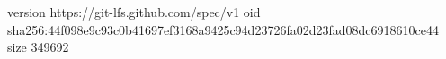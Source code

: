 version https://git-lfs.github.com/spec/v1
oid sha256:44f098e9c93c0b41697ef3168a9425c94d23726fa02d23fad08dc6918610ce44
size 349692
